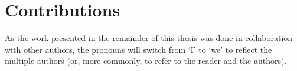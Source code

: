 




\section{Contributions}

As the work presented in the remainder of this thesis was done in collaboration with other authors, the pronouns will switch from `I' to `we' to reflect the multiple authors (or, more commonly, to refer to the reader and the authors).

